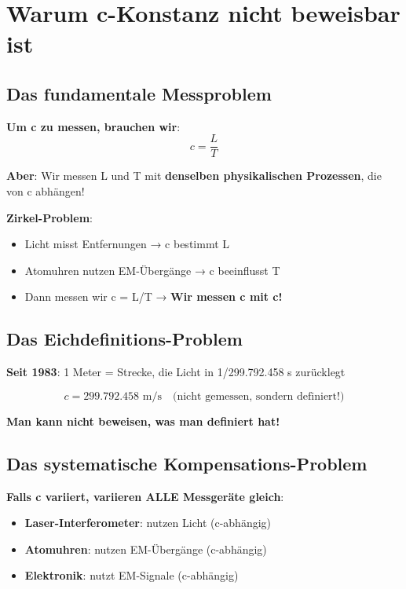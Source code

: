\documentclass[12pt,a4paper]{article}
\begin{document}
	\section{Warum c-Konstanz nicht beweisbar ist}
	
	\subsection{Das fundamentale Messproblem}
	
	\textbf{Um c zu messen, brauchen wir}:
	\begin{equation}
		c = \frac{L}{T}
	\end{equation}
	
	\textbf{Aber}: Wir messen L und T mit \textbf{denselben physikalischen Prozessen}, die von c abhängen!
	
	\textbf{Zirkel-Problem}:
	\begin{itemize}
		\item Licht misst Entfernungen → c bestimmt L
		\item Atomuhren nutzen EM-Übergänge → c beeinflusst T
		\item Dann messen wir c = L/T → \textbf{Wir messen c mit c!}
	\end{itemize}
	
	\subsection{Das Eichdefinitions-Problem}
	
	\textbf{Seit 1983}: 1 Meter = Strecke, die Licht in 1/299.792.458 s zurücklegt
	
	\begin{equation}
		c = 299.792.458 \text{ m/s} \quad \text{(nicht gemessen, sondern definiert!)}
	\end{equation}
	
	\textbf{Man kann nicht beweisen, was man definiert hat!}
	
	\subsection{Das systematische Kompensations-Problem}
	
	\textbf{Falls c variiert, variieren ALLE Messgeräte gleich}:
	\begin{itemize}
		\item \textbf{Laser-Interferometer}: nutzen Licht (c-abhängig)
		\item \textbf{Atomuhren}: nutzen EM-Übergänge (c-abhängig)
		\item \textbf{Elektronik}: nutzt EM-Signale (c-abhängig)
	\end{itemize}
	
\end{document}
